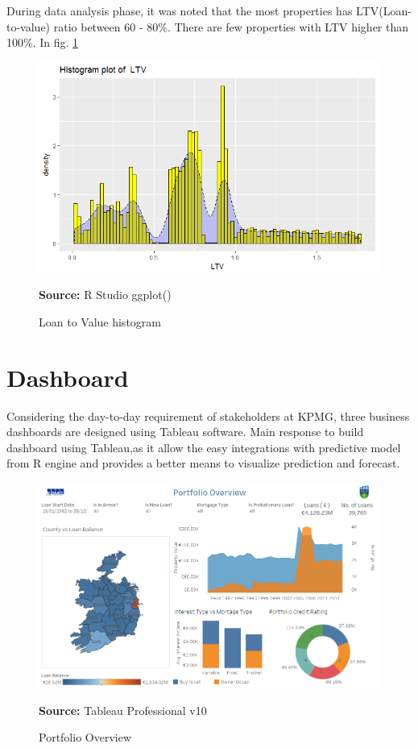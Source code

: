 During data analysis phase, it was noted that the most properties has LTV(Loan-to-value) ratio between 60 - 80\%. There are few properties with LTV higher than 100\%.
In fig. \ref{fig:ltv}
\begin{center}
\begin{figure}[!htb]
\includegraphics[scale=0.5]{ltv.png}
\centering
\caption{Loan to Value histogram}{\textbf{Source:} R Studio ggplot()}
\label{fig:ltv}
\end{figure}
\end{center}


\section{Dashboard}
Considering the day-to-day requirement of stakeholders at KPMG, three business dashboards are designed using Tableau software. Main response to build dashboard using Tableau,as it allow the easy integrations with predictive model from R engine and provides a better means to visualize prediction and forecast.

\begin{center}
\begin{figure}[!htb]
\includegraphics[width=\textwidth]{Overview.png}
\centering
\caption{Portfolio Overview}{\textbf{Source:} Tableau Professional v10}
\label{fig:overview}
\end{figure}
\end{center}


